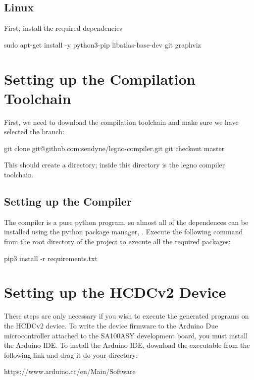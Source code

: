 \subsection{Linux}

First, install the required dependencies

\begin{snippet}
sudo apt-get install -y python3-pip libatlas-base-dev git graphviz
\end{snippet}

\section{Setting up the Compilation Toolchain}


First, we need to download the compilation toolchain and make sure we have
selected the  branch:

\begin{snippet}
  git clone git@github.com:sendyne/legno-compiler.git
  git checkout master
\end{snippet}

This should create a  directory; inside this directory is the
legno compiler toolchain.

\subsection{Setting up the Compiler}
The compiler is a pure python program, so almost all of the dependences can be
installed using the python package manager, . Execute the following command
from the root directory of the  project to execute all the required packages:

\begin{snippet}
  pip3 install -r requirements.txt
\end{snippet}

\section{Setting up the HCDCv2 Device}
These steps are only necessary if you wish to execute the generated programs on
the HCDCv2 device. To write the device firmware to the Arduino Due microcontroller attached
to the SA100ASY development board, you must install the Arduino IDE. To install
the Arduino IDE, download the executable from the following link and drag it do your  directory:

\begin{snippet}
https://www.arduino.cc/en/Main/Software
\end{snippet}

